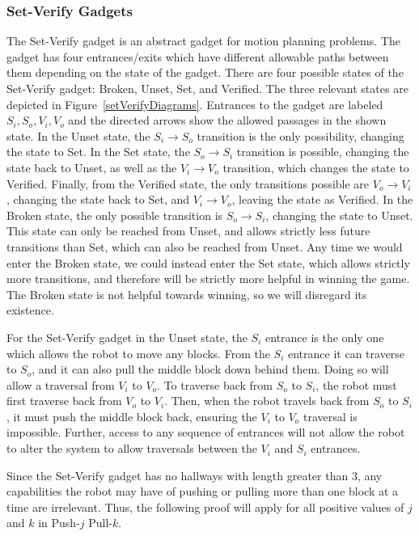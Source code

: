 \subsubsection{Set-Verify Gadgets}
\label{sec:SetVerifyGadgets}
The Set-Verify gadget is an abstract gadget for motion planning problems. The gadget has four entrances/exits which have different allowable paths between them depending on the state of the gadget. There are four possible states of the Set-Verify gadget: Broken, Unset, Set, and Verified. The three relevant states are depicted in Figure~\ref{setVerifyDiagrams}. Entrances to the gadget are labeled $S_i, S_o, V_i, V_o$ and the directed arrows show the allowed passages in the shown state. In the Unset state, the $S_i \rightarrow S_o$ transition is the only possibility, changing the state to Set. In the Set state, the $S_o \rightarrow S_i$ transition is possible, changing the state back to Unset, as well as the $V_i \rightarrow V_o$ transition, which changes the state to Verified. Finally, from the Verified state, the only transitions possible are $V_o \rightarrow V_i$, changing the state back to Set, and $V_i \rightarrow V_o$, leaving the state as Verified. In the Broken state, the only possible transition is $S_o \rightarrow S_i$, changing the state to Unset. This state can only be reached from Unset, and allows strictly less future transitions than Set, which can also be reached from Unset. Any time we would enter the Broken state, we could instead enter the Set state, which allows strictly more transitions, and therefore will be strictly more helpful in winning the game. The Broken state is not helpful towards winning, so we will disregard its existence.

For the Set-Verify gadget in the Unset state, the $S_i$ entrance is the only one which allows the robot to move any blocks. From the $S_i$ entrance it can traverse to $S_o$, and it can also pull the middle block down behind them. Doing so will allow a traversal from $V_i$ to $V_o$. To traverse back from $S_o$ to $S_i$, the robot must first traverse back from $V_o$ to $V_i$. Then, when the robot travels back from $S_o$ to $S_i$, it must push the middle block back, ensuring the $V_i$ to $V_o$ traversal is impossible. Further, access to any sequence of entrances will not allow the robot to alter the system to allow traversals between the $V_i$ and $S_i$ entrances. 

Since the Set-Verify gadget has no hallways with length greater than 3, any capabilities the robot may have of pushing or pulling more than one block at a time are irrelevant. Thus, the following proof will apply for all positive values of $j$ and $k$ in Push-$j$ Pull-$k$.

